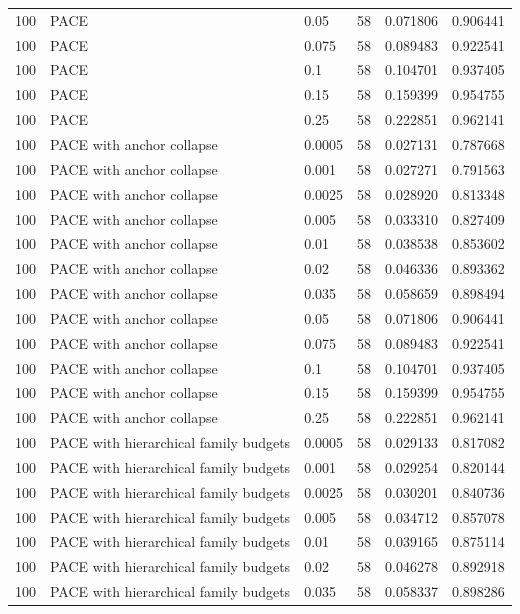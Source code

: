\begin{tabular}{llllll}
100 & PACE & 0.05 & 58 & 0.071806 & 0.906441 \\
100 & PACE & 0.075 & 58 & 0.089483 & 0.922541 \\
100 & PACE & 0.1 & 58 & 0.104701 & 0.937405 \\
100 & PACE & 0.15 & 58 & 0.159399 & 0.954755 \\
100 & PACE & 0.25 & 58 & 0.222851 & 0.962141 \\
100 & PACE with anchor collapse & 0.0005 & 58 & 0.027131 & 0.787668 \\
100 & PACE with anchor collapse & 0.001 & 58 & 0.027271 & 0.791563 \\
100 & PACE with anchor collapse & 0.0025 & 58 & 0.028920 & 0.813348 \\
100 & PACE with anchor collapse & 0.005 & 58 & 0.033310 & 0.827409 \\
100 & PACE with anchor collapse & 0.01 & 58 & 0.038538 & 0.853602 \\
100 & PACE with anchor collapse & 0.02 & 58 & 0.046336 & 0.893362 \\
100 & PACE with anchor collapse & 0.035 & 58 & 0.058659 & 0.898494 \\
100 & PACE with anchor collapse & 0.05 & 58 & 0.071806 & 0.906441 \\
100 & PACE with anchor collapse & 0.075 & 58 & 0.089483 & 0.922541 \\
100 & PACE with anchor collapse & 0.1 & 58 & 0.104701 & 0.937405 \\
100 & PACE with anchor collapse & 0.15 & 58 & 0.159399 & 0.954755 \\
100 & PACE with anchor collapse & 0.25 & 58 & 0.222851 & 0.962141 \\
100 & PACE with hierarchical family budgets & 0.0005 & 58 & 0.029133 & 0.817082 \\
100 & PACE with hierarchical family budgets & 0.001 & 58 & 0.029254 & 0.820144 \\
100 & PACE with hierarchical family budgets & 0.0025 & 58 & 0.030201 & 0.840736 \\
100 & PACE with hierarchical family budgets & 0.005 & 58 & 0.034712 & 0.857078 \\
100 & PACE with hierarchical family budgets & 0.01 & 58 & 0.039165 & 0.875114 \\
100 & PACE with hierarchical family budgets & 0.02 & 58 & 0.046278 & 0.892918 \\
100 & PACE with hierarchical family budgets & 0.035 & 58 & 0.058337 & 0.898286 \\

\end{tabular}

